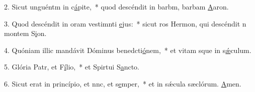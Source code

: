 2. Sicut unguéntm in c\uline{á}pite,~* quod descéndit in barbm, barbam \uline{A}aron.\par 
3. Quod descéndit in oram vestimnti \uline{e}jus:~* sicut ros Hermon, qui descéndit n montem S\uline{i}on.\par 
4. Quóniam illic mandávit Dóminus benedcti\uline{ó}nem,~* et vitam sque in s\uline{ǽ}culum.\par 
5. Glória Patr, et F\uline{í}lio,~* et Spirtui S\uline{a}ncto.\par 
6. Sicut erat in princípio, et nnc, et s\uline{e}mper,~* et in sǽcula sæclórum. \uline{A}men.\par 
